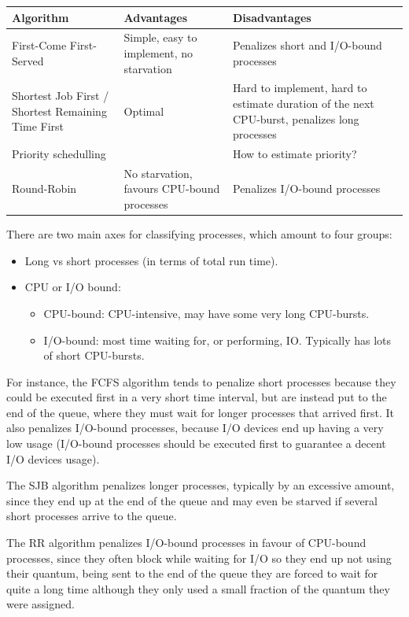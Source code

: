 \documentclass{sope}
\begin{document}
{
\begin{center}
\begin{tabular}{p{25mm} | p{60mm} | p{60mm}}
    \textbf{Algorithm} & \textbf{Advantages} & \textbf{Disadvantages} \\ \hline
    First-Come First-Served & Simple, easy to implement, no starvation & Penalizes short and I/O-bound processes \\ \hline
    Shortest Job First / Shortest Remaining Time First & Optimal & Hard to implement, hard to estimate duration of the next CPU-burst, penalizes long processes \\ \hline
    Priority schedulling & & How to estimate priority? \\ \hline
    Round-Robin & No starvation, favours CPU-bound processes & Penalizes I/O-bound processes
\end{tabular}
\end{center}
There are two main axes for classifying processes, which amount to four groups:
\begin{itemize}
    \item Long vs short processes (in terms of total run time).
    \item CPU or I/O bound:
    \begin{itemize}
        \item CPU-bound: CPU-intensive, may have some very long CPU-bursts.
        \item I/O-bound: most time waiting for, or performing, IO. Typically has lots of short CPU-bursts.
    \end{itemize}
\end{itemize}
For instance, the FCFS algorithm tends to penalize short processes because they could be executed first in a very short time interval, but are instead put to the end of the queue, where they must wait for longer processes that arrived first. It also penalizes I/O-bound processes, because I/O devices end up having a very low usage (I/O-bound processes should be executed first to guarantee a decent I/O devices usage).

The SJB algorithm penalizes longer processes, typically by an excessive amount, since they end up at the end of the queue and may even be starved if several short processes arrive to the queue.

The RR algorithm penalizes I/O-bound processes in favour of CPU-bound processes, since they often block while waiting for I/O so they end up not using their quantum, being sent to the end of the queue they are forced to wait for quite a long time although they only used a small fraction of the quantum they were assigned.

}
\end{document}
